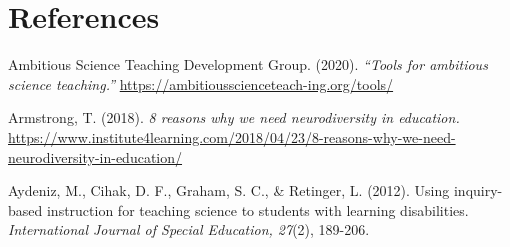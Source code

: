 \documentclass[11.5pt]{sig-alternate}
\newcommand{\nextitem}{~~\llap{\textbullet}~~}
\begin{document}
\begin{large}

\clearpage
\end{large}
\section*{References}\par 

\leftskip 0.25in
\parindent -0.25in 

Ambitious Science Teaching Development Group. (2020). \textit{“Tools for ambitious science teaching.”} \url{https://ambitiousscienceteach-ing.org/tools/}

Armstrong, T. (2018). \textit{8 reasons why we need neurodiversity in education.} \url{https://www.institute4learning.com/2018/04/23/8-reasons-why-we-need-neurodiversity-in-education/}

Aydeniz, M., Cihak, D. F., Graham, S. C., \& Retinger, L. (2012). Using inquiry-based instruction for teaching science to students with learning disabilities. \textit{International Journal of Special Education, 27}(2), 189-206.
\end{document}
